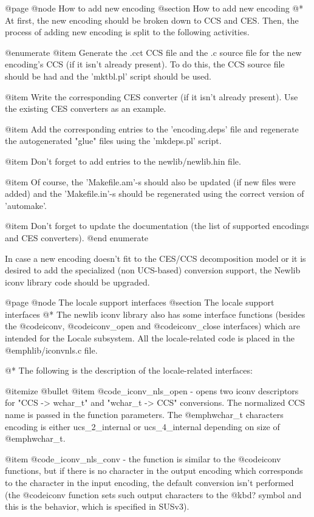 @page
@node How to add new encoding
@section How to add new encoding
@*
At first, the new encoding should be broken down to CCS and CES. Then,
the process of adding new encoding is split to the following activities.

@enumerate
@item Generate the .cct CCS file and the .c source file for the new
encoding's CCS (if it isn't already present). To do this, the CCS source
file should be had and the 'mktbl.pl' script should be used.

@item Write the corresponding CES converter (if it isn't already
present). Use the existing CES converters as an example.

@item
Add the corresponding entries to the 'encoding.deps' file and regenerate
the autogenerated "glue" files using the 'mkdeps.pl' script.

@item
Don't forget to add entries to the newlib/newlib.hin file.

@item
Of course, the 'Makefile.am'-s should also be updated (if new files were
added) and the 'Makefile.in'-s should be regenerated using the correct
version of 'automake'.

@item
Don't forget to update the documentation (the list of
supported encodings and CES converters).
@end enumerate

In case a new encoding doesn't fit to the CES/CCS decomposition model or
it is desired to add the specialized (non UCS-based) conversion support,
the Newlib iconv library code should be upgraded.





@page
@node The locale support interfaces
@section The locale support interfaces
@*
The newlib iconv library also has some interface functions (besides the
@code{iconv}, @code{iconv_open} and @code{iconv_close} interfaces) which
are intended for the Locale subsystem. All the locale-related code is
placed in the @emph{lib/iconvnls.c} file.

@*
The following is the description of the locale-related interfaces:

@itemize @bullet
@item
@code{_iconv_nls_open} - opens two iconv descriptors for "CCS ->
wchar_t" and "wchar_t -> CCS" conversions. The normalized CCS name is
passed in the function parameters. The @emph{wchar_t} characters encoding is
either ucs_2_internal or ucs_4_internal depending on size of
@emph{wchar_t}.

@item
@code{_iconv_nls_conv} - the function is similar to the @code{iconv}
functions, but if there is no character in the output encoding which
corresponds to the character in the input encoding, the default
conversion isn't performed (the @code{iconv} function sets such output
characters to the @kbd{?} symbol and this is the behavior, which is
specified in SUSv3).

